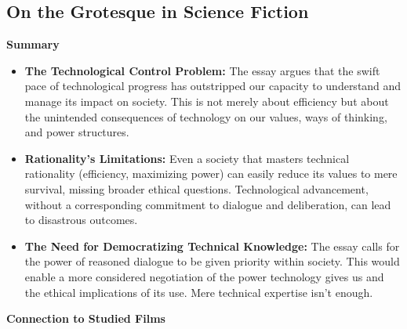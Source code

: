 \documentclass[11pt,fleqn]{book} %
\begin{document}
\subsection{On the Grotesque in Science Fiction}
\textbf{Summary}

\begin{itemize}
\item \textbf{The Technological Control Problem:} The essay argues that the swift pace of technological progress has outstripped our capacity to understand and manage its impact on society. This is not merely about efficiency but about the unintended consequences of technology on our values, ways of thinking, and power structures.

\item \textbf{Rationality's Limitations:} Even a society that masters technical rationality (efficiency, maximizing power) can easily reduce its values to mere survival, missing broader ethical questions. Technological advancement, without a corresponding commitment to dialogue and deliberation, can lead to disastrous outcomes.

\item \textbf{The Need for Democratizing Technical Knowledge:} The essay calls for the power of reasoned dialogue to be given priority within society. This would enable a more considered negotiation of the power technology gives us and the ethical implications of its use. Mere technical expertise isn't enough. 
\end{itemize}
\vspace{5pt}
\textbf{Connection to Studied Films}
\end{document}
